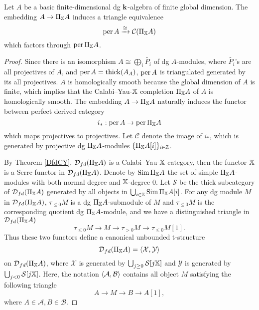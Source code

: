 \begin{theorem}\label{main thm}
  Let $A$ be a basic finite-dimensional dg $\mathbf{k}$-algebra of finite global dimension.
  The embedding $A \to \Pi_{\mathbb{X}}A$ induces a triangle equivalence
  \[ \operatorname{per} A \xrightarrow{\cong} \operatorname{\mathcal{C}}(\Pi_{\mathbb{X}}A) \]
  which factors through $\operatorname{per} \Pi_{\mathbb{X}}A$.
\end{theorem}
\begin{proof}
  Since there is an isomorphism
  $A \cong \bigoplus_{i}\widetilde{P_i}$ of dg $A$-modules,
  where $\widetilde{P_i}$'s are all projectives of $A$,
  and $\operatorname{per} A = \operatorname{thick}(A_A)$,
  $\operatorname{per} A$ is triangulated generated by its all projectives.
  $A$ is homologically smooth because the global dimension of $A$ is finite,
  which implies that the Calabi--Yau-$\mathbb{X}$ completion $\Pi_{\mathbb{X}}A$ of $A$
  is homologically smooth.
  The embedding $A \to \Pi_{\mathbb{X}}A$
  naturally induces the functor between perfect derived category
  \[ i_*: \operatorname{per} A \to \operatorname{per}\Pi_{\mathbb{X}}A \]
  which maps projectives to projectives.
  Let $\mathcal{C}$ denote the image of $i_*$,
  which is generated by projective dg $\Pi_{\mathbb{X}}A$-modules
  $\{\Pi_{\mathbb{X}}A[i]\}_{i \in \mathbb{Z}}$.

  By Theorem \ref{DfdCY},
  $\operatorname{\mathcal{D}}_{fd}(\Pi_{\mathbb{X}}A)$ is a Calabi--Yau-$\mathbb{X}$ category,
  then the functor $\mathbb{X}$ is a Serre functor in $\operatorname{\mathcal{D}}_{fd}(\Pi_{\mathbb{X}}A)$.
  Denote by $\operatorname{Sim} \Pi_{\mathbb{X}}A$ the set of simple $\Pi_{\mathbb{X}}A$-modules
  with both normal degree and $\mathbb{X}$-degree $0$.
  Let $\mathcal{S}$ be the thick subcategory of $\operatorname{\mathcal{D}}_{fd}(\Pi_{\mathbb{X}}A)$
  generated by all objects in $\bigcup_{i \in \mathbb{Z}}\operatorname{Sim} \Pi_{\mathbb{X}}A[i]$.
  For any dg module $M$ in $\operatorname{\mathcal{D}}_{fd}(\Pi_{\mathbb{X}}A)$,
  $\tau_{\leq 0}M$ is a dg $\Pi_{\mathbb{X}}A$-submodule of $M$ and $\tau_{\leq 0}M$
  is the corresponding quotient dg $\Pi_{\mathbb{X}}A$-module,
  and we have a distinguished triangle in $\operatorname{\mathcal{D}}_{fd}(\Pi_{\mathbb{X}}A)$
  \[ \tau_{\leq 0}M \to M \to \tau_{>0}M \to \tau_{\leq 0}M[1].\]
  Thus these two functors define a canonical unbounded t-structure
  \[ \operatorname{\mathcal{D}}_{fd}(\Pi_{\mathbb{X}}A) = \langle \mathcal{X}, \mathcal{Y} \rangle \]
  on $\operatorname{\mathcal{D}}_{fd}(\Pi_{\mathbb{X}}A)$,
  where $\mathcal{X}$ is generated by $\bigcup_{j \geq 0} \mathcal{S}[j\mathbb{X}]$
  and $\mathcal{Y}$ is generated by $\bigcup_{j < 0} \mathcal{S}[j\mathbb{X}]$.
  Here, the notation $\langle \mathcal{A}, \mathcal{B} \rangle$
  contains all object $M$ satisfying the following triangle
  \[ A \to M \to B \to A[1], \]
  where $A\in\mathcal{A}, B\in\mathcal{B}.$


\end{proof}
